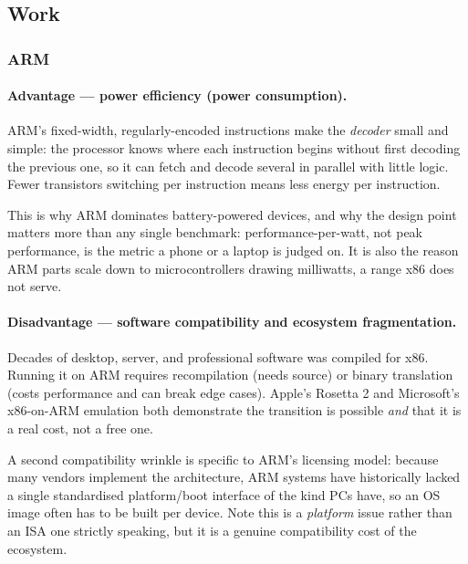 
\subsection*{Work}

\subsubsection*{ARM}

\paragraph{Advantage --- power efficiency (power consumption).}
{\sloppy
ARM's fixed-width, regularly-encoded instructions make the \emph{decoder} small
and simple: the processor knows where each instruction begins without first
decoding the previous one, so it can fetch and decode several in parallel with
little logic. Fewer transistors switching per instruction means less energy per
instruction.\par}

This is why ARM dominates battery-powered devices, and why the design point
matters more than any single benchmark: performance-per-watt, not peak
performance, is the metric a phone or a laptop is judged on. It is also the
reason ARM parts scale down to microcontrollers drawing milliwatts, a range x86
does not serve.


\paragraph{Disadvantage --- software compatibility and ecosystem fragmentation.}
Decades of desktop, server, and professional software was compiled for x86.
Running it on ARM requires recompilation (needs source) or binary translation
(costs performance and can break edge cases). Apple's Rosetta 2 and Microsoft's
x86-on-ARM emulation both demonstrate the transition is possible \emph{and} that
it is a real cost, not a free one.

A second compatibility wrinkle is specific to ARM's licensing model: because
many vendors implement the architecture, ARM systems have historically lacked a
single standardised platform/boot interface of the kind PCs have, so an OS image
often has to be built per device.  Note this is a \emph{platform} issue rather than an ISA one
strictly speaking, but it is a genuine compatibility cost of the ecosystem.

